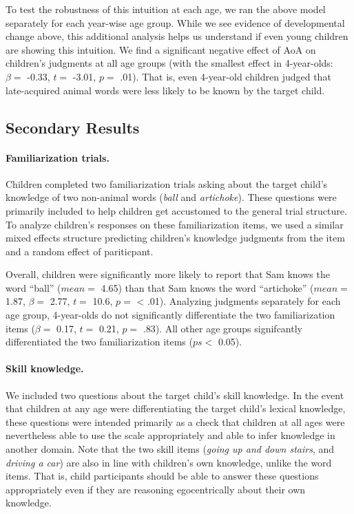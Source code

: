 \documentclass[10pt, letterpaper]{article}
\begin{document}
To test the robustness of this intuition at each age, we ran the above
model separately for each year-wise age group. While we see evidence of
developmental change above, this additional analysis helps us understand
if even young children are showing this intuition. We find a significant
negative effect of AoA on children's judgments at all age groups (with
the smallest effect in 4-year-olds: \(\beta =\) -0.33, \(t =\) -3.01,
\(p =\) .01). That is, even 4-year-old children judged that
late-acquired animal words were less likely to be known by the target
child.

\hypertarget{secondary-results}{%
\subsection{Secondary Results}\label{secondary-results}}

\hypertarget{familiarization-trials.}{%
\paragraph{Familiarization trials.}\label{familiarization-trials.}}

Children completed two familiarization trials asking about the target
child's knowledge of two non-animal words (\emph{ball} and
\emph{artichoke}). These questions were primarily included to help
children get accustomed to the general trial structure. To analyze
children's responses on these familiarization items, we used a similar
mixed effects structure predicting children's knowledge judgments from
the item and a random effect of pariticpant.

Overall, children were significantly more likely to report that Sam
knows the word ``ball'' (\(mean =\) 4.65) than that Sam knows the word
``artichoke'' (\(mean =\) 1.87, \(\beta =\) 2.77, \(t =\) 10.6, \(p =\)
\textless{} .01). Analyzing judgments separately for each age group,
4-year-olds do not significantly differentiate the two familiarization
items (\(\beta =\) 0.17, \(t =\) 0.21, \(p =\) .83). All other age
groups signifcantly differentiated the two familiarization items
(\(ps <\) 0.05).

\hypertarget{skill-knowledge.}{%
\paragraph{Skill knowledge.}\label{skill-knowledge.}}

We included two questions about the target child's skill knowledge. In
the event that children at any age were differentiating the target
child's lexical knowledge, these questions were intended primarily as a
check that children at all ages were nevertheless able to use the scale
appropriately and able to infer knowledge in another domain. Note that
the two skill items (\emph{going up and down stairs}, and \emph{driving
a car}) are also in line with children's own knowledge, unlike the word
items. That is, child participants should be able to answer these
questions appropriately even if they are reasoning egocentrically about
their own knowledge.
\end{document}
